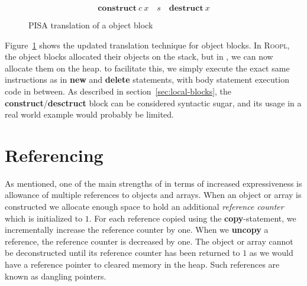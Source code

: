 \begin{figure}[ht]
    \centering
    \begin{equation*}
        \textbf{construct}\ c\ x\quad s\quad\textbf{destruct}\ x
    \end{equation*}
    \caption{PISA translation of a \rooplpp object block}
    \label{fig:pisa-object-block}
\end{figure}

Figure~\ref{fig:pisa-object-block} shows the updated translation technique for object blocks. In \textsc{Roopl}, the object blocks allocated their objects on the stack, but in \rooplpp, we can now allocate them on the heap. to facilitate this, we simply execute the exact same instructions as in \textbf{new} and \textbf{delete} statements, with body statement execution code in between. As described in section~\ref{sec:local-blocks}, the \textbf{construct}/\textbf{desctruct} block can be considered syntactic sugar, and its usage in a real world example would probably be limited.


\section{Referencing}
\label{sec:referencing-compilation}
As mentioned, one of the main strengths of \rooplpp in terms of increased expressiveness is allowance of multiple references to objects and arrays. When an object or array is constructed we allocate enough space to hold an additional \textit{reference counter} which is initialized to $1$. For each reference copied using the \textbf{copy}-statement, we incrementally increase the reference counter by one. When we \textbf{uncopy} a reference, the reference counter is decreased by one. The object or array cannot be deconstructed until its reference counter has been returned to $1$ as we would have a reference pointer to cleared memory in the heap. Such references are known as dangling pointers.

